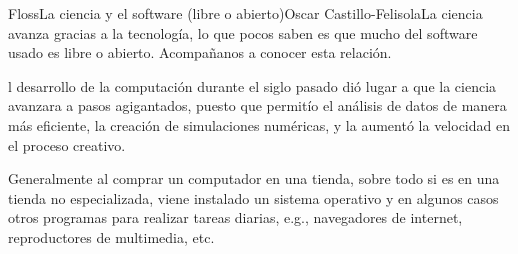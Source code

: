 

\begin{Artikel}{Floss}{La ciencia y el software (libre o abierto)}{Oscar Castillo-Felisola}{La ciencia avanza gracias a la tecnolog\'ia, lo que pocos saben es que mucho del software usado es libre o abierto. Acompa\~nanos a conocer esta relaci\'on.}
  
l desarrollo de la computaci\'on durante el siglo pasado di\'o lugar a que la ciencia avanzara a pasos agigantados, puesto que permit\'io el an\'alisis de datos de manera m\'as eficiente, la creaci\'on de simulaciones num\'ericas, y la aument\'o la velocidad en el proceso creativo.



Generalmente al comprar un computador en una tienda, sobre todo si es en una tienda no especializada, viene instalado un sistema operativo y en algunos casos otros programas para realizar tareas diarias, e.g., navegadores de internet, reproductores de multimedia, etc. 


\end{Artikel}
